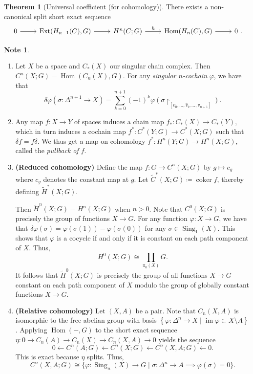 \documentclass[10pt,letterpaper,cm]{nupset}
\theoremstyle{definition}
\newtheorem{note}[definition]{Note}
\theoremstyle{theorem}
\newtheorem{theorem}[definition]{Theorem}
\theoremstyle{remark}
\newcommand{\1}{\mathbb{1}}
\newcommand{\0}{\vec 0}
\newcommand{\from}{\longleftarrow}
\DeclareMathOperator{\im}{im}
\DeclareMathOperator{\ext}{Ext}
\DeclareMathOperator{\Hom}{Hom}
\DeclareMathOperator{\coker}{coker}
\DeclareMathOperator{\sing}{Sing}
\begin{document}
\begin{theorem}[Universal coefficient (for cohomology)]
There exists a non-canonical split short exact sequence $$\begin{tikzcd}
0 \arrow[r] & \ext(H_{n-1}(C), G) \arrow[r] & H^n(C; G) \arrow[r, "h"] & \Hom(H_n(C), G) \arrow[r] & 0
\end{tikzcd}     .$$
\end{theorem}

\begin{note} $ $
\begin{enumerate}
\item Let $X$ be a space and $C_{\ast}(X)$ our singular chain complex. Then $C^n(X; G) = \Hom(C_n(X), G)$. For any \textit{singular $n$-cochain} $\varphi$, we have that $$\delta{\varphi}(\sigma : \Delta^{n+1} \to X) = \sum_{k=0}^{n+1}({-1})^k\varphi(\sigma \restriction_{ [v_0, \ldots, \hat{v}_i, \ldots, v_{n+1}]}).$$ 
\item Any map $f: X \to Y$ of spaces induces a chain map $f_{\ast} : C_{\ast}(X) \to C_{\ast}(Y)$, which in turn induces a cochain map $f^{\ast} : C^{\ast}(Y; G) \to C^{\ast}(X; G)$ such that $\delta{f} = f{\delta}$.  We thus get a map on cohomology $f^{\ast} : H^n(Y; G) \to H^n(X;G)$, called the \textit{pullback of $f$}.
\item  {\textbf{(Reduced cohomology)}} Define the map $f : G \to C^n(X; G)$ by $g \mapsto c_g$ where $c_g$ denotes the constant map at $g$. Let $\widetilde{C}^{\ast}(X; G) \coloneqq  \coker{f}$, thereby defining $\widetilde{H}^{\ast}(X; G)$.

Then $\widetilde{H}^n(X; G) = H^n(X; G)$ when $n>0$. Note that $C^0(X; G)$ is precisely the group of functions $X \to G$. For any function $\varphi : X \to G$, we have that $\delta{\varphi}(\sigma) = \varphi(\sigma(1)) - \varphi(\sigma(0))$ for any $\sigma \in \sing_1(X)$. This shows that $\varphi$ is a cocycle if and only if it is constant on each path component of $X$. Thus, $$H^0(X; G) \cong \prod_{\pi_0(X)} G.$$ It follows that $\widetilde{H}^0(X; G)$ is precisely the group of all functions $X \to G$ constant on each path component of $X$ modulo the group of globally constant functions $X \to G$.
\item  {\textbf{(Relative cohomology)}} Let $(X, A)$ be a pair.  Note that $C_n(X,A)$ is isomorphic to the free abelian group with basis $\left\{\varphi : \Delta^n \to X \mid \im{\varphi} \subset X \setminus A\right\}$. Applying $\Hom({-}, G)$ to the short exact sequence $\eta: 0 \to C_n(A) \to C_n(X) \to C_n(X,A) \to 0$ yields the sequence $$ 0 \from C^n(A; G) \from C^n(X; G) \from C^n(X, A; G) \from 0  .$$ This is exact because $\eta$ splits. Thus, $$ C^n(X, A; G) \cong \{\varphi : \sing_n(X) \to G \mid \sigma : \Delta^n \to A \implies \varphi(\sigma) = 0\}.$$
\end{enumerate}
\end{note}
\end{document}
